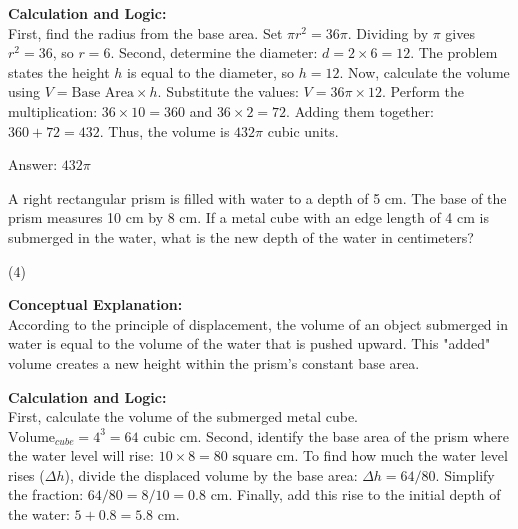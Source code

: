 \documentclass[11pt,paper=a4,answers]{exam}
\begin{document}
\begin{questions}
\begin{solution}
\vspace{30pt}

\textbf{Calculation and Logic:} \\
First, find the radius from the base area. Set $\pi r^2 = 36\pi$. Dividing by $\pi$ gives $r^2 = 36$, so $r = 6$. Second, determine the diameter: $d = 2 \times 6 = 12$. The problem states the height $h$ is equal to the diameter, so $h = 12$. Now, calculate the volume using $V = \text{Base Area} \times h$. Substitute the values: $V = 36\pi \times 12$. Perform the multiplication: $36 \times 10 = 360$ and $36 \times 2 = 72$. Adding them together: $360 + 72 = 432$. Thus, the volume is $432\pi$ cubic units.

\vspace{30pt}

Answer: \colorbox{yellow!100}{$432\pi$}
\end{solution}

\vspace{60pt}

\question
A right rectangular prism is filled with water to a depth of 5 cm. The base of the prism measures 10 cm by 8 cm. If a metal cube with an edge length of 4 cm is submerged in the water, what is the new depth of the water in centimeters?
\begin{tasks}(4)
\end{tasks}

\begin{solution}
\textbf{Conceptual Explanation:} \\
According to the principle of displacement, the volume of an object submerged in water is equal to the volume of the water that is pushed upward. This "added" volume creates a new height within the prism's constant base area.

\vspace{30pt}

\textbf{Calculation and Logic:} \\
First, calculate the volume of the submerged metal cube. $\text{Volume}_{cube} = 4^3 = 64 \text{ cubic cm}$. Second, identify the base area of the prism where the water level will rise: $10 \times 8 = 80 \text{ square cm}$. To find how much the water level rises ($\Delta h$), divide the displaced volume by the base area: $\Delta h = 64 / 80$. Simplify the fraction: $64 / 80 = 8 / 10 = 0.8 \text{ cm}$. Finally, add this rise to the initial depth of the water: $5 + 0.8 = 5.8 \text{ cm}$.


\end{solution}
\end{questions}
\end{document}
